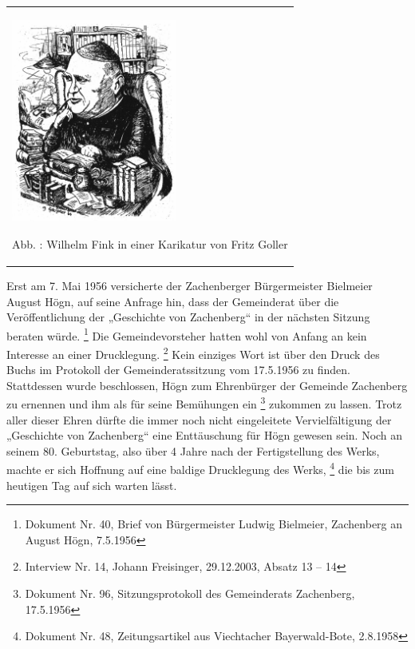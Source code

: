 \begin{center}
\begin{minipage}{5.812cm}
\begin{center}
\tablefirsthead{}
\tablehead{}
\tabletail{}
\tablelasttail{}
\begin{supertabular}{m{5.612cm}}

\includegraphics[width=5.429cm,height=6.68cm]{pictures/zulassungsarbeit-img044.png}

Abb. : Wilhelm Fink in einer Karikatur von
Fritz Goller\\
\end{supertabular}
\end{center}
\end{minipage}
\end{center}
Erst am 7. Mai 1956 versicherte der Zachenberger Bürgermeister Bielmeier
August Högn, auf seine Anfrage hin, dass der Gemeinderat über die
Veröffentlichung der „Geschichte von Zachenberg“ in der nächsten
Sitzung beraten würde. \footnote{Dokument Nr. 40, Brief von
Bürgermeister Ludwig Bielmeier, Zachenberg an August Högn, 7.5.1956}
Die Gemeindevorsteher hatten wohl von Anfang an kein Interesse an einer
Drucklegung. \footnote{Interview Nr. 14, Johann Freisinger, 29.12.2003,
Absatz 13 – 14} Kein einziges Wort ist über den Druck des Buchs im
Protokoll der Gemeinderatssitzung vom 17.5.1956 zu finden. Stattdessen
wurde beschlossen, Högn zum Ehrenbürger der Gemeinde Zachenberg zu
ernennen und ihm als für seine
Bemühungen ein  \footnote{Dokument Nr. 96,
Sitzungsprotokoll des Gemeinderats Zachenberg, 17.5.1956} zukommen zu
lassen. Trotz aller dieser Ehren dürfte die immer noch nicht
eingeleitete Vervielfältigung der „Geschichte von Zachenberg“ eine
Enttäuschung für Högn gewesen sein. Noch an seinem 80. Geburtstag, also
über 4 Jahre nach der Fertigstellung des Werks, machte er sich Hoffnung
auf eine baldige Drucklegung des Werks, \footnote{Dokument Nr. 48,
Zeitungsartikel aus Viechtacher Bayerwald-Bote, 2.8.1958} die bis zum
heutigen Tag auf sich warten lässt.

